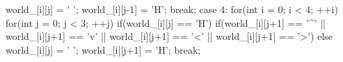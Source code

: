 \begin{answercode}
{{{{{{                            {
                                world_[i][j] = ' ';
                                world_[i][j-1] = 'H';
                            }
                        }
                    }
                }
                break;
            case 4:
                for(int i = 0; i < 4; ++i)
                {
                    for(int j = 0; j < 3; ++j)
                    {
                        if(world_[i][j] == 'H')
                        {
                            if(world_[i][j+1] == '^' ||
                               world_[i][j+1] == 'v' ||
                               world_[i][j+1] == '<' ||
                               world_[i][j+1] == '>')
                            {}
                            else
                            {
                                world_[i][j] = ' ';
                                world_[i][j+1] = 'H';
                            }
                        }
                    }
                }
                break;
        }
    }
}


\end{answercode}
